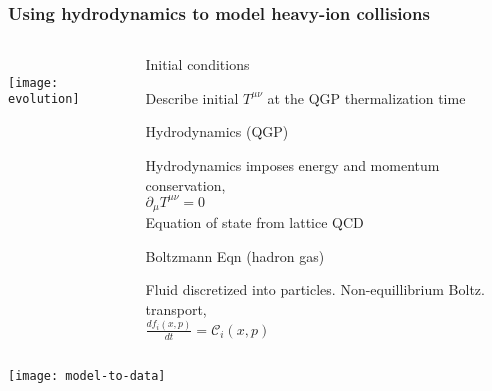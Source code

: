 \documentclass[svgnames]{beamer}
\begin{document}
\begin{frame}

 \frametitle{Using hydrodynamics to model heavy-ion collisions}
 \vspace{0.05 in}
 \begin{columns}
  \begin{column}{0.4\textwidth}
   \vspace{0.15 in} \\
   \texttt{[image: evolution]}
  \end{column}
  
  \begin{column}{0.5\textwidth}
  
  \begin{block}{\strut \small Initial conditions}
  \footnotesize Describe initial $T^{\mu\nu}$ at the QGP thermalization time 
  \end{block}
  
  \begin{block}{\strut \small Hydrodynamics (QGP)}
   \footnotesize Hydrodynamics imposes energy and momentum conservation, \\   
   \vspace{0.1 in}
   {\centering $\partial_\mu T^{\mu \nu} = 0$}\\
   \vspace{0.1 in}
   \footnotesize Equation of state from lattice QCD
  \end{block}

  \begin{block}{\strut \small Boltzmann Eqn (hadron gas)}
    \footnotesize Fluid discretized into particles. Non-equillibrium Boltz. transport,
    \vspace{0.1 in} \\
    \centering
    $\frac{df_i(x,p)}{dt} = \mathcal{C}_i(x,p)$ 
  \end{block}
  
  \vspace{0.2 in}

  \end{column}
  \end{columns}

 
\end{frame}

\begin{frame}
  \texttt{[image: model-to-data]}
\end{frame}
\end{document}
